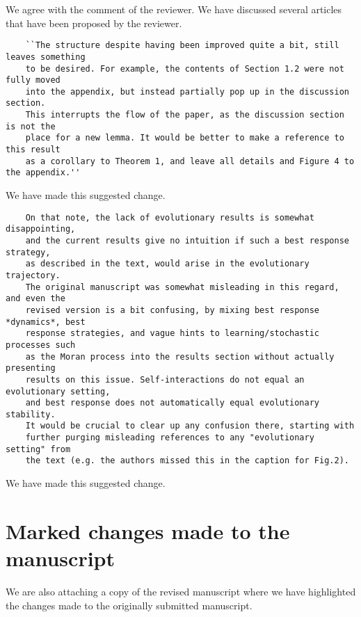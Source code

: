 \documentclass{article}
\begin{document}
We agree with the comment of the reviewer. We have discussed several articles
that have been proposed by the reviewer.

\begin{verbatim}
    ``The structure despite having been improved quite a bit, still leaves something
    to be desired. For example, the contents of Section 1.2 were not fully moved
    into the appendix, but instead partially pop up in the discussion section.
    This interrupts the flow of the paper, as the discussion section is not the
    place for a new lemma. It would be better to make a reference to this result
    as a corollary to Theorem 1, and leave all details and Figure 4 to the appendix.''
\end{verbatim}

We have made this suggested change.

\begin{verbatim}
    On that note, the lack of evolutionary results is somewhat disappointing,
    and the current results give no intuition if such a best response strategy,
    as described in the text, would arise in the evolutionary trajectory.
    The original manuscript was somewhat misleading in this regard, and even the
    revised version is a bit confusing, by mixing best response *dynamics*, best
    response strategies, and vague hints to learning/stochastic processes such
    as the Moran process into the results section without actually presenting
    results on this issue. Self-interactions do not equal an evolutionary setting,
    and best response does not automatically equal evolutionary stability.
    It would be crucial to clear up any confusion there, starting with
    further purging misleading references to any "evolutionary setting" from
    the text (e.g. the authors missed this in the caption for Fig.2).
\end{verbatim}

We have made this suggested change.

\section{Marked changes made to the manuscript}

We are also attaching a copy of the revised manuscript where we have highlighted
the changes made to the originally submitted manuscript.


\end{document}

